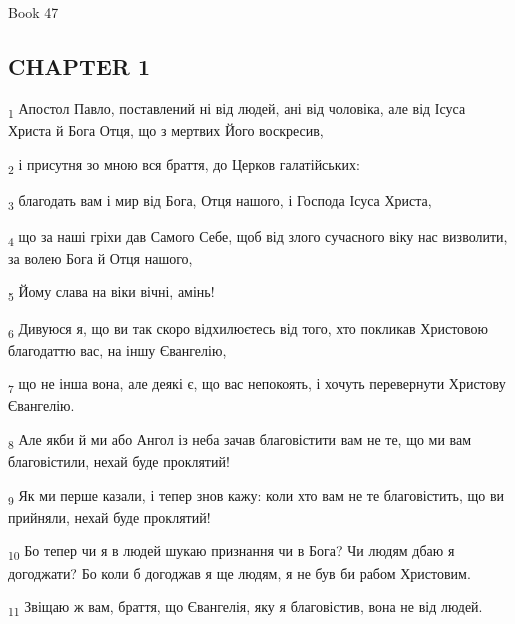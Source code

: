 Book 47
\subsection{CHAPTER 1}
\begin{tcolorbox}
\textsubscript{1} Апостол Павло, поставлений ні від людей, ані від чоловіка, але від Ісуса Христа й Бога Отця, що з мертвих Його воскресив,
\end{tcolorbox}
\begin{tcolorbox}
\textsubscript{2} і присутня зо мною вся браття, до Церков галатійських:
\end{tcolorbox}
\begin{tcolorbox}
\textsubscript{3} благодать вам і мир від Бога, Отця нашого, і Господа Ісуса Христа,
\end{tcolorbox}
\begin{tcolorbox}
\textsubscript{4} що за наші гріхи дав Самого Себе, щоб від злого сучасного віку нас визволити, за волею Бога й Отця нашого,
\end{tcolorbox}
\begin{tcolorbox}
\textsubscript{5} Йому слава на віки вічні, амінь!
\end{tcolorbox}
\begin{tcolorbox}
\textsubscript{6} Дивуюся я, що ви так скоро відхилюєтесь від того, хто покликав Христовою благодаттю вас, на іншу Євангелію,
\end{tcolorbox}
\begin{tcolorbox}
\textsubscript{7} що не інша вона, але деякі є, що вас непокоять, і хочуть перевернути Христову Євангелію.
\end{tcolorbox}
\begin{tcolorbox}
\textsubscript{8} Але якби й ми або Ангол із неба зачав благовістити вам не те, що ми вам благовістили, нехай буде проклятий!
\end{tcolorbox}
\begin{tcolorbox}
\textsubscript{9} Як ми перше казали, і тепер знов кажу: коли хто вам не те благовістить, що ви прийняли, нехай буде проклятий!
\end{tcolorbox}
\begin{tcolorbox}
\textsubscript{10} Бо тепер чи я в людей шукаю признання чи в Бога? Чи людям дбаю я догоджати? Бо коли б догоджав я ще людям, я не був би рабом Христовим.
\end{tcolorbox}
\begin{tcolorbox}
\textsubscript{11} Звіщаю ж вам, браття, що Євангелія, яку я благовістив, вона не від людей.
\end{tcolorbox}

